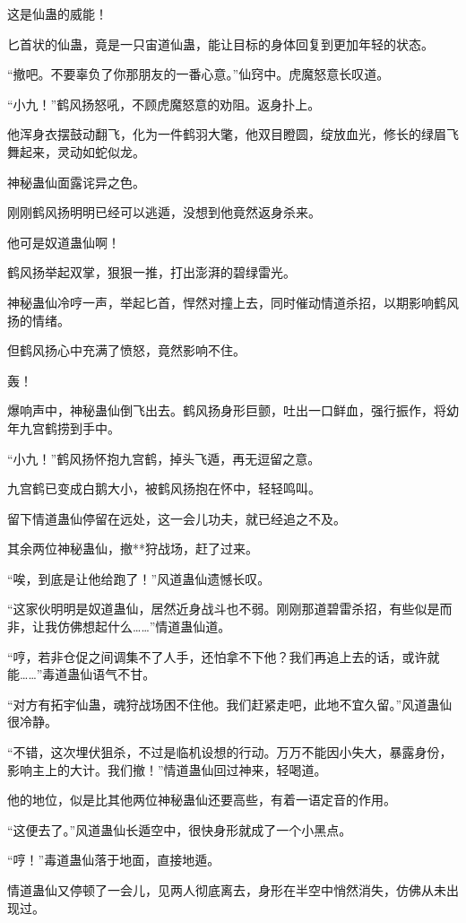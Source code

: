 \begin{this_body}
这是仙蛊的威能！

匕首状的仙蛊，竟是一只宙道仙蛊，能让目标的身体回复到更加年轻的状态。

“撤吧。不要辜负了你那朋友的一番心意。”仙窍中。虎魔怒意长叹道。

“小九！”鹤风扬怒吼，不顾虎魔怒意的劝阻。返身扑上。

他浑身衣摆鼓动翻飞，化为一件鹤羽大氅，他双目瞪圆，绽放血光，修长的绿眉飞舞起来，灵动如蛇似龙。

神秘蛊仙面露诧异之色。

刚刚鹤风扬明明已经可以逃遁，没想到他竟然返身杀来。

他可是奴道蛊仙啊！

鹤风扬举起双掌，狠狠一推，打出澎湃的碧绿雷光。

神秘蛊仙冷哼一声，举起匕首，悍然对撞上去，同时催动情道杀招，以期影响鹤风扬的情绪。

但鹤风扬心中充满了愤怒，竟然影响不住。

轰！

爆响声中，神秘蛊仙倒飞出去。鹤风扬身形巨颤，吐出一口鲜血，强行振作，将幼年九宫鹤捞到手中。

“小九！”鹤风扬怀抱九宫鹤，掉头飞遁，再无逗留之意。

九宫鹤已变成白鹅大小，被鹤风扬抱在怀中，轻轻鸣叫。

留下情道蛊仙停留在远处，这一会儿功夫，就已经追之不及。

其余两位神秘蛊仙，撤**狩战场，赶了过来。

“唉，到底是让他给跑了！”风道蛊仙遗憾长叹。

“这家伙明明是奴道蛊仙，居然近身战斗也不弱。刚刚那道碧雷杀招，有些似是而非，让我仿佛想起什么……”情道蛊仙道。

“哼，若非仓促之间调集不了人手，还怕拿不下他？我们再追上去的话，或许就能……”毒道蛊仙语气不甘。

“对方有拓宇仙蛊，魂狩战场困不住他。我们赶紧走吧，此地不宜久留。”风道蛊仙很冷静。

“不错，这次埋伏狙杀，不过是临机设想的行动。万万不能因小失大，暴露身份，影响主上的大计。我们撤！”情道蛊仙回过神来，轻喝道。

他的地位，似是比其他两位神秘蛊仙还要高些，有着一语定音的作用。

“这便去了。”风道蛊仙长遁空中，很快身形就成了一个小黑点。

“哼！”毒道蛊仙落于地面，直接地遁。

情道蛊仙又停顿了一会儿，见两人彻底离去，身形在半空中悄然消失，仿佛从未出现过。


\end{this_body}
